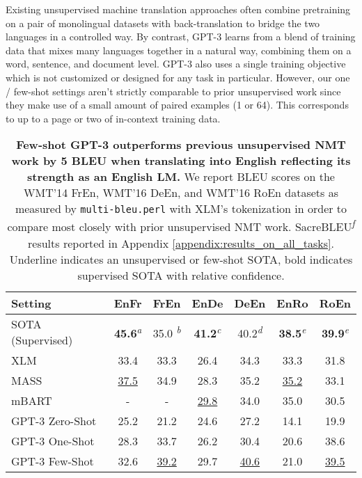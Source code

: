 \documentclass{article}
\begin{document}
Existing unsupervised machine translation approaches often combine pretraining on a pair of monolingual datasets with back-translation \cite{sennrich2015improving} to bridge the two languages in a controlled way. By contrast, GPT-3 learns from a blend of training data that mixes many languages together in a natural way, combining them on a word, sentence, and document level. GPT-3 also uses a single training objective which is not customized or designed for any task in particular. However, our one / few-shot settings aren't strictly comparable to prior unsupervised work since they make use of a small amount of paired examples (1 or 64). This corresponds to up to a page or two of in-context training data. 


\begin{table}
    \centering
        \begin{tabular}{l c c c c c c}
        \toprule
        Setting & EnFr & FrEn & EnDe & DeEn & EnRo & RoEn \\ 
        \midrule
        SOTA (Supervised) & \textbf{45.6}\textsuperscript{\textit{a}} & 35.0 \textsuperscript{\textit{b}} & \textbf{41.2}\textsuperscript{\textit{c}} & 40.2\textsuperscript{\textit{d}} & \textbf{38.5}\textsuperscript{\textit{e}} & \textbf{39.9}\textsuperscript{\textit{e}} \\
        \midrule
        XLM \cite{lample2019cross} & 33.4 & 33.3 & 26.4 & 34.3 & 33.3 & 31.8 \\
        MASS \cite{song2019mass} & \underline{37.5} & 34.9 & 28.3 & 35.2 & \underline{35.2} & 33.1 \\
        mBART \cite{liu2020multilingual} & - & - & \underline{29.8} & 34.0 & 35.0 & 30.5 \\
        \midrule
        GPT-3 Zero-Shot  & 25.2 & 21.2 & 24.6 & 27.2 & 14.1 & 19.9 \\
        GPT-3 One-Shot & 28.3 & 33.7 & 26.2 & 30.4 & 20.6 & 38.6 \\
        GPT-3 Few-Shot & 32.6 & \underline{39.2} & 29.7 & \underline{40.6} & 21.0 & \underline{39.5} \\
        \bottomrule
        \end{tabular}
    \caption{\textbf{Few-shot GPT-3 outperforms previous unsupervised NMT work by 5 BLEU when translating into English reflecting its strength as an English LM.} We report BLEU scores on the WMT'14 FrEn, WMT’16 DeEn, and WMT'16 RoEn datasets as measured by \texttt{multi-bleu.perl} with XLM's tokenization in order to compare most closely with prior unsupervised NMT work. SacreBLEU\textsuperscript{\textit{f}} \cite{post2018call} results reported in Appendix \ref{appendix:results_on_all_tasks}. Underline indicates an unsupervised or few-shot SOTA, bold indicates supervised SOTA with relative confidence.
}
\end{table}
\end{document}
